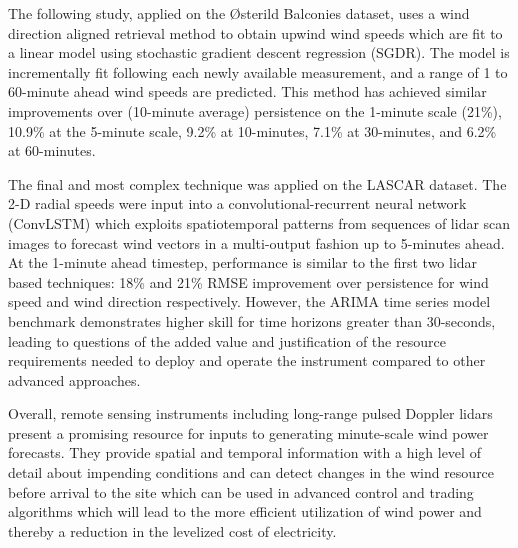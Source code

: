 The following study, applied on the {\O}sterild Balconies dataset, uses a wind direction aligned retrieval method to obtain upwind wind speeds which are fit to a linear model using stochastic gradient descent regression (SGDR). The model is incrementally fit following each newly available measurement, and a range of 1 to 60-minute ahead wind speeds are predicted. This method has achieved similar improvements over (10-minute average) persistence on the 1-minute scale (21\%), 10.9\% at the 5-minute scale, 9.2\% at 10-minutes, 7.1\% at 30-minutes, and 6.2\% at 60-minutes. 

The final and most complex technique was applied on the LASCAR dataset. The 2-D radial speeds were input into a convolutional-recurrent neural network (ConvLSTM) which exploits spatiotemporal patterns from sequences of lidar scan images to forecast wind vectors in a multi-output fashion up to 5-minutes ahead. At the 1-minute ahead timestep, performance is similar to the first two lidar based techniques: 18\% and 21\% RMSE improvement over persistence for wind speed and wind direction respectively. However, the ARIMA time series model benchmark demonstrates higher skill for time horizons greater than 30-seconds, leading to questions of the added value and justification of the resource requirements needed to deploy and operate the instrument compared to other advanced approaches.

Overall, remote sensing instruments including long-range pulsed Doppler lidars present a promising resource for inputs to generating minute-scale wind power forecasts. They provide spatial and temporal information with a high level of detail about impending conditions and can detect changes in the wind resource before arrival to the site which can be used in advanced control and trading algorithms which will lead to the more efficient utilization of wind power and thereby a reduction in the levelized cost of electricity.


\begin{comment}
The time horizon of forecast models on these scales must be doable within this, to give automated or advisory...
-----------------------------------------------------
ts modeling vs lidar
\end{comment}

